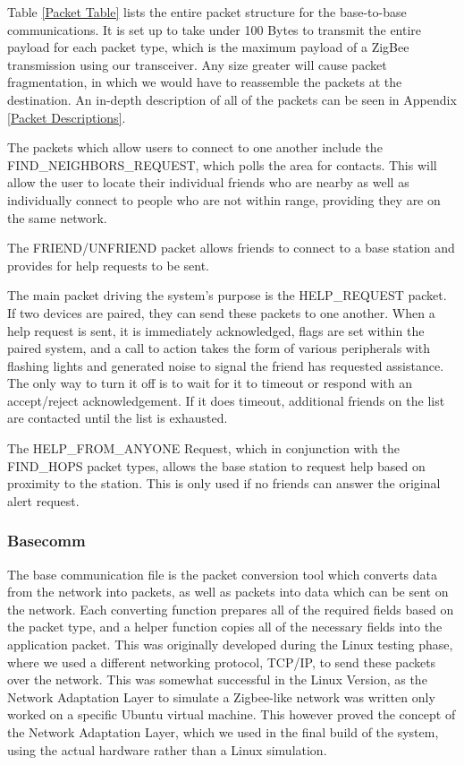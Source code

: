 \documentclass[journal,compsoc]{IEEEtran}
\begin{document}
Table \ref{Packet Table} lists the entire packet structure for the base-to-base communications.  It is set up to take under 100 Bytes to transmit the entire payload for each packet type, which is the maximum payload of a ZigBee transmission using our transceiver. Any size greater will cause packet fragmentation, in which we would have to reassemble the packets at the destination. An in-depth description of all of the packets can be seen in Appendix \ref{Packet Descriptions}.

The packets which allow users to connect to one another include the FIND\_NEIGHBORS\_REQUEST, which polls the area for contacts.  This will allow the user to locate their individual friends who are nearby as well as individually connect to people who are not within range, providing they are on the same network.

The FRIEND/UNFRIEND packet allows friends to connect to a base station and provides for help requests to be sent.

The main packet driving the system's purpose is the HELP\_REQUEST packet.  If two devices are paired, they can send these packets to one another.  When a help request is sent, it is immediately acknowledged, flags are set within the paired system, and a call to action takes the form of various peripherals with flashing lights and generated noise to signal the friend has requested assistance.  The only way to turn it off is to wait for it to timeout or respond with an accept/reject acknowledgement.  If it does timeout, additional friends on the list are contacted until the list is exhausted.

The HELP\_FROM\_ANYONE Request, which in conjunction with the FIND\_HOPS packet types, allows the base station to request help based on proximity to the station.  This is only used if no friends can answer the original alert request.

\subsubsection{Basecomm}
The base communication file is the packet conversion tool which converts data from the network into packets, as well as packets into data which can be sent on the network. Each converting function prepares all of the required fields based on the packet type, and a helper function copies all of the necessary fields into the application packet. This was originally developed during the Linux testing phase, where we used a different networking protocol, TCP/IP, to send these packets over the network. This was somewhat successful in the Linux Version, as the Network Adaptation Layer to simulate a Zigbee-like network was written only worked on a specific Ubuntu virtual machine. This however proved the concept of the Network Adaptation Layer, which we used in the final build of the system, using the actual hardware rather than a Linux simulation.
\end{document}
